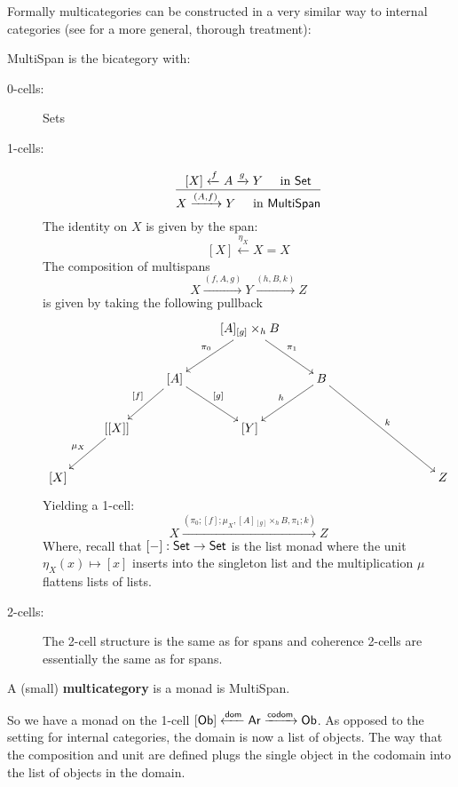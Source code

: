 Formally multicategories can be constructed in a very similar way to internal categories (see \cite[Defininition 4.2.2]{leinster} for a more general, thorough treatment):
\begin{definition}
{\sf MultiSpan} is the bicategory with:
\begin{description}
\item[0-cells:] Sets
\item[1-cells:] 
$$
\dfrac{[X] \xleftarrow{f} A \xrightarrow{g} Y \hspace*{.5cm}\text{in $\mathsf{Set}$}}
{X \xrightarrow{(A,f)} Y  \hspace*{.5cm}\text{in {\sf MultiSpan}}}
$$
The identity on $X$ is given by the span:
$$ [X] \xleftarrow{\eta_X } X = X$$
The composition of multispans
$$X \xrightarrow{(f,A,g)} Y\xrightarrow{(h,B,k)} Z $$
is given by taking the following pullback
$$
\xymatrix{
     &         &      &[A] {}_{[g]}\times_h B \ar[dr]^{\pi_1} \ar[dl]_{\pi_0} \\
     &         &[A] \ar[dr]^{[g]} \ar[dl]_{[f]}&      & B \ar[dl]_h \ar[ddrrr]^k &   & \\
     & [[X]] \ar[dl]_{\mu_X} &      &[Y] &    &    &  \\
[X] &         &      &     &    &    &&Z
}
$$
Yielding a 1-cell:
$$
X\xrightarrow{(\pi_0;[f];\mu_X, [A] {}_{[g]}\times_h B, \pi_1;k)} Z
$$
Where, recall that $[-]:\mathsf{Set}\to\mathsf{Set} $ is the list monad where the unit $\eta_X(x)\mapsto [x]$ inserts into the singleton list  and the multiplication $\mu$ flattens lists of lists.
\item[2-cells:] The 2-cell structure is the same as for spans and coherence 2-cells are essentially the same as for spans.
\end{description}
\end{definition}
\begin{definition}
A (small) {\bf multicategory} is a monad is {\sf MultiSpan}.
\end{definition}
So we have a monad on the 1-cell $[ {\sf Ob}] \xleftarrow{\sf dom} {\sf Ar} \xrightarrow{\sf codom} {\sf Ob}$.  As opposed to the setting for internal categories, the domain is now a list of objects.  The way that the composition and unit are defined plugs the single object in the codomain into the list of objects in the domain.



